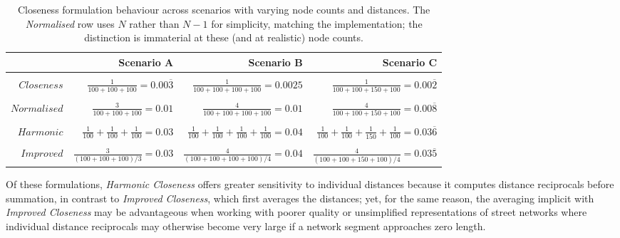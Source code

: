 \begin{table}[htbp]
  \centering
  \small
  \setlength{\tabcolsep}{4pt}
  \begin{tabular}{ r | r r r }
    &
    Scenario A &
    Scenario B &
    Scenario C \\
    \midrule
    \\
    $Closeness$ &
    $\frac{1}{100+100+100}=0.00\overline{3}$ &
    $\frac{1}{100+100+100+100}=0.0025$ &
    $\frac{1}{100+100+150+100}=0.00\overline{2}$ \\
    \\
    $Normalised$ &
    $\frac{3}{100+100+100}=0.01$ &
    $\frac{4}{100+100+100+100}=0.01$ &
    $\frac{4}{100+100+150+100}=0.00\overline{8}$ \\
    \\
    $Harmonic$ &
    $\frac{1}{100} + \frac{1}{100} + \frac{1}{100}=0.03$ &
    $\frac{1}{100} + \frac{1}{100} + \frac{1}{100} + \frac{1}{100}=0.04$ &
    $\frac{1}{100} + \frac{1}{100} + \frac{1}{150} + \frac{1}{100}=0.03\overline{6}$ \\
    \\
    $Improved$ &
    $\frac{3}{(100+100+100)/3}=0.03$ &
    $\frac{4}{(100+100+100+100)/4}=0.04$ &
    $\frac{4}{(100+100+150+100)/4}=0.03\overline{5}$ \\
  \end{tabular}
  \caption{Closeness formulation behaviour across scenarios with varying node counts and distances. The \emph{Normalised} row uses $N$ rather than $N-1$ for simplicity, matching the implementation; the distinction is immaterial at these (and at realistic) node counts.}\label{table:closeness_comparisons}
\end{table}

Of these formulations, \emph{Harmonic Closeness} offers greater sensitivity to individual distances because it computes distance reciprocals before summation, in contrast to \emph{Improved Closeness}, which first averages the distances; yet, for the same reason, the averaging implicit with \emph{Improved Closeness} may be advantageous when working with poorer quality or unsimplified representations of street networks where individual distance reciprocals may otherwise become very large if a network segment approaches zero length.
